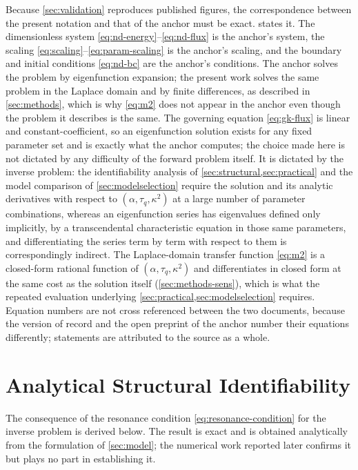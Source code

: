 \documentclass[preprint,12pt,a4paper]{elsarticle}
\theoremstyle{plain}
\theoremstyle{definition}
\theoremstyle{remark}
\newcommand{\tq}{\tau_{q}}
\newcommand{\kk}{\kappa^{2}}
\begin{document}
Because \cref{sec:validation} reproduces published figures, the correspondence
between the present notation and that of the anchor must be exact.
 states it. The dimensionless system
\eqref{eq:nd-energy}--\eqref{eq:nd-flux} is the anchor's system, the scaling
\eqref{eq:scaling}--\eqref{eq:param-scaling} is the anchor's scaling, and the
boundary and initial conditions \eqref{eq:nd-bc} are the anchor's conditions.
The anchor solves the problem by eigenfunction expansion; the present work
solves the same problem in the Laplace domain and by finite differences, as
described in \cref{sec:methods}, which is why \eqref{eq:m2} does not appear in
the anchor even though the problem it describes is the same. The governing
equation \eqref{eq:gk-flux} is linear and constant-coefficient, so an
eigenfunction solution exists for any fixed parameter set and is exactly what
the anchor computes; the choice made here is not dictated by any difficulty of
the forward problem itself. It is dictated by the inverse problem: the
identifiability analysis of \cref{sec:structural,sec:practical} and the model
comparison of \cref{sec:modelselection} require the solution and its analytic
derivatives with respect to $(\alpha,\tq,\kk)$ at a large number of parameter
combinations, whereas an eigenfunction series has eigenvalues defined only
implicitly, by a transcendental characteristic equation in those same
parameters, and differentiating the series term by term with respect to them
is correspondingly indirect. The Laplace-domain transfer function
\eqref{eq:m2} is a closed-form rational function of $(\alpha,\tq,\kk)$ and
differentiates in closed form at the same cost as the solution itself
(\cref{sec:methods-sens}), which is what the repeated evaluation underlying
\cref{sec:practical,sec:modelselection} requires. Equation numbers
are not cross referenced between the two documents, because the version of
record and the open preprint of the anchor number their equations differently;
statements are attributed to the source as a whole.



\section{Analytical Structural Identifiability}
\label{sec:structural}

The consequence of the resonance condition
\eqref{eq:resonance-condition} for the inverse problem is derived below. The result is exact and
is obtained analytically from the formulation of \cref{sec:model}; the
numerical work reported later confirms it but plays no part in establishing it.
\end{document}
